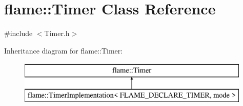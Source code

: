 \hypertarget{classflame_1_1_timer}{\section{flame\-:\-:Timer Class Reference}
\label{classflame_1_1_timer}
}


{\ttfamily \#include $<$Timer.\-h$>$}

Inheritance diagram for flame\-:\-:Timer\-:\begin{figure}[H]
\begin{center}
\leavevmode
\includegraphics[height=2.000000cm]{classflame_1_1_timer}
\end{center}
\end{figure}
